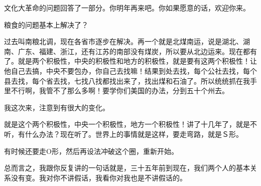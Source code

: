 文化大革命的问题回答了一部分。你明年再来吧。你如果愿意的话，欢迎你来。

粮食的问题基本上解决了？

过去叫南粮北调，现在各省市逐步在解决。再一个就是北煤南运，说是湖北、湖南、广东、福建、浙江，还有江苏的南部没有煤炭，所以要从北边运来。现在都有了。就是两个积极性，中央的积极性和地方的积极性，就是要有这两个积极性！让他自己去搞，中央不要包办，你自己去找嘛！结果到处去找，每个公社去找，每个县去找，每个省去找，七找八找都找出来了，找出煤和石油了。所以统统抓在我手里不行啊，我管不了那么多啊！要学你们美国的办法，分到五十个州去。

我这次来，注意到有很大的变化。

就是这个两个积极性，中央一个积极性，地方一个积极性！讲了十几年了，就是不听，有什么办法？现在听了。世界上的事情就是这样，要走弯路，就是Ｓ形。

有时候还要走O形，然后再设法冲破这个圈，重新开始。

总而言之，我跟你反复讲的一句话就是，三十五年前到现在，我们两个人的基本关系没有变。我对你不讲假话，我看你对我也是不讲假话的。

